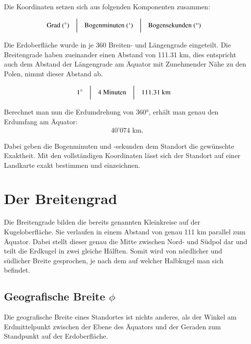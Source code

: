 \begin{refsection}
Die Koordinaten setzen sich aus folgenden Komponenten zusammen:

\[
\begin{aligned}
&\text{Grad } (^{\circ})
&
&\text{\bigg \vert}
&
&\text{Bogenminuten } (`)
&
&\text{\bigg \vert}
&
&\text{Bogensekunden } (``)
\end{aligned}
\]


Die Erdoberfläche wurde in je 360 Breiten- und Längengrade eingeteilt. Die Breitengrade haben zueinander einen Abstand von 111.31 km, dies entspricht auch dem Abstand der Längengrade am Äquator mit Zunehmender Nähe zu den Polen, nimmt dieser Abstand ab.

\[
\begin{aligned}
&1^{\circ}
&
&\text{\bigg \vert}
&
&4 \text{ Minuten}
&
&\text{\bigg \vert}
&
&111.31\text{ km}
\end{aligned}
\]

Berechnet man nun die Erdumdrehung von 360°, erhält man genau den Erdumfang am Äquator: \begin{align*} 40’074 \text{ km.}\end{align*}

Dabei geben die Bogenminuten und -sekunden dem Standort die gewünschte Exaktheit. Mit den vollständigen Koordinaten lässt sich der Standort auf einer Landkarte exakt bestimmen und einzeichnen.

\section{Der Breitengrad}
Die Breitengrade bilden die bereits genannten Kleinkreise auf der Kugeloberfläche. Sie verlaufen in einem Abstand von genau 111 km parallel zum Äquator. Dabei stellt  dieser genau die Mitte zwischen Nord- und Südpol dar und teilt die Erdkugel in zwei gleiche Hälften. Somit wird von nördlicher und südlicher Breite gesprochen, je nach dem auf welcher Halbkugel man sich befindet.


\subsection{Geografische Breite $\phi$}
\begin{definition}
Die geografische Breite eines Standortes ist nichts anderes, als der Winkel am Erdmittelpunkt zwischen der Ebene des Äquators und der Geraden zum Standpunkt auf der Erdoberfläche.
\end{definition}


\end{refsection}
